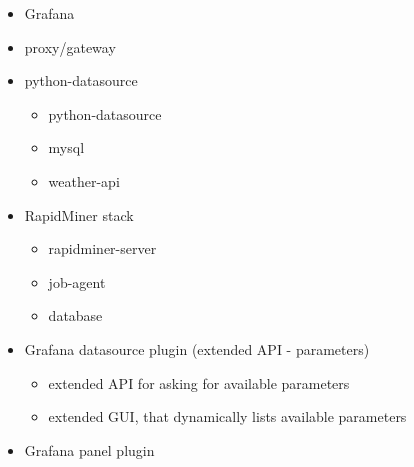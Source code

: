 \begin{itemize}
	\item Grafana
	\item proxy/gateway
	\item python-datasource
	\begin{itemize}
		\item python-datasource
		\item mysql
		\item weather-api
	\end{itemize}
	\item RapidMiner stack
	\begin{itemize}
		\item rapidminer-server
		\item job-agent
		\item database
	\end{itemize}
	\item Grafana datasource plugin (extended API - parameters)
	\begin{itemize}
		\item extended API for asking for available parameters
		\item extended GUI, that dynamically lists available parameters
	\end{itemize}
	\item Grafana panel plugin
\end{itemize}